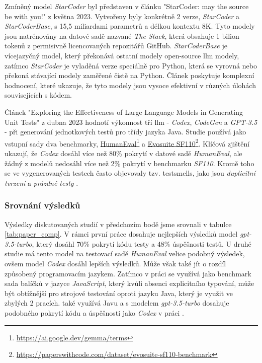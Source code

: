 \documentclass[czech, ma, kiv, he, iso690numb, pdf, viewonly]{fasthesis}
\begin{document}
    Zmíněný model \emph{StarCoder} byl představen v článku "StarCoder: may the source be with you!" \cite{StarCoder2023} z května 2023. Vytvořeny byly konkrétně 2 verze, \textit{StarCoder} a \textit{StarCoderBase}, s 15,5 miliardami parametrů a délkou kontextu 8K. Tyto modely jsou natrénovány na datové sadě nazvané \textit{The Stack}, která obsahuje 1 bilion tokenů z permisivně licencovaných repozitářů GitHub. \textit{StarCoderBase} je vícejazyčný model, který překonává ostatní modely open-source \gls{llm} modely, zatímco \textit{StarCoder} je vyladěná verze speciálně pro Python, která se vyrovná nebo překoná stávající modely zaměřené čistě na Python. Článek poskytuje komplexní hodnocení, které ukazuje, že tyto modely jsou vysoce efektivní v různých úlohách souvisejících s kódem.

    Článek "Exploring the Effectiveness of Large Language Models in Generating Unit Tests" \cite{siddiq2023exploring} z dubna 2023 hodnotí výkonnost tří \gls{llm} - \textit{Codex}, \textit{CodeGen} a \textit{GPT-3.5} - při generování jednotkových testů pro třídy jazyka Java. Studie používá jako vstupní sady dva benchmarky, \href{https://paperswithcode.com/dataset/humaneval-x}{HumanEval}\footnote{\url{https://ai.google.dev/gemma/terms}} a \href{https://paperswithcode.com/dataset/evosuite-sf110-benchmark}{Evosuite SF110}\footnote{\url{https://paperswithcode.com/dataset/evosuite-sf110-benchmark}}. Klíčová zjištění ukazují, že \textit{Codex} dosáhl více než 80\% pokrytí v datové sadě \textit{HumanEval}, ale žádný z modelů nedosáhl více než 2\% pokrytí v benchmarku \textit{SF110}. Kromě toho se ve vygenerovaných testech často objevovaly tzv. \gls{testsmells}, jako jsou \textit{duplicitní tvrzení} a \textit{prázdné testy} \cite{testsmells}.

    \subsubsection{Srovnání výsledků}
    Výsledky diskutovaných studií v předchozím bodě jsme srovnali v tabulce \ref{tab:paper_comp}. V rámci první práce dosahuje nejlepších výsledků model \textit{gpt-3.5-turbo}, který dosáhl 70\% pokrytí kódu testy a 48\% úspěšnosti testů. U druhé studie má tento model na testovací sadě \textit{HumanEval} velice podobný výsledek, ovšem model \textit{Codex} dosáhl lepších výsledků. Může však také jít o rozdíl způsobený programovacím jazykem. Zatímco v práci \cite{schafer2023empirical} se využívá jako benchmark sada balíčků v jazyce \textit{JavaScript}, který kvůli absenci explicitního typování, může být obtížnější pro strojové testování oproti jazyku Java, který je využit ve zbylých 2 pracích. \cite{jutai} také využívá Javu a s modelem \textit{gpt-3.5-turbo} dosahuje podobného pokrytí kódu a úspěšnosti jako \textit{Codex} v práci \cite{siddiq2023exploring}.
\end{document}
